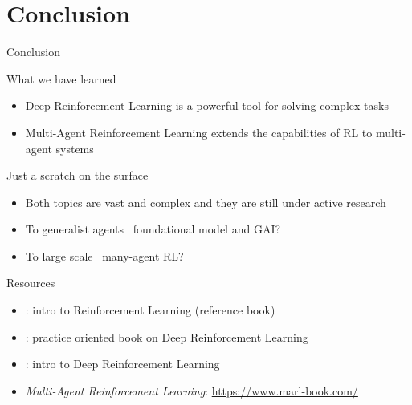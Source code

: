 \documentclass[presentation, 9pt]{beamer}\mode<presentation>{\usetheme{AMSBolognaFC}}
\begin{document}
\section{Conclusion}
\begin{frame}[shrink=5]{Conclusion}
	\begin{block}{What we have learned}
		\begin{itemize}
			\item Deep Reinforcement Learning is a powerful tool for solving complex tasks
			\item Multi-Agent Reinforcement Learning extends the capabilities of RL to multi-agent systems 
		\end{itemize}
	\end{block}
	\begin{exampleblock}{Just a scratch on the surface}
		\begin{itemize}
			\item Both topics are vast and complex and they are still under active research
			\item To generalist agents \faArrowRight \, foundational model and GAI?
			\item To large scale \faArrowRight \, many-agent RL?
		\end{itemize}
	\end{exampleblock}
	\begin{block}{Resources}
		\begin{itemize}
			\item {}: intro to Reinforcement Learning (reference book)
			\item {}: practice oriented book on Deep Reinforcement Learning
			\item {}: intro to Deep Reinforcement Learning
			\item \emph{Multi-Agent Reinforcement Learning}: \url{https://www.marl-book.com/}
		\end{itemize}
	\end{block}
\end{frame}
	
\section*{}

\frame{\titlepage}
\end{document}
